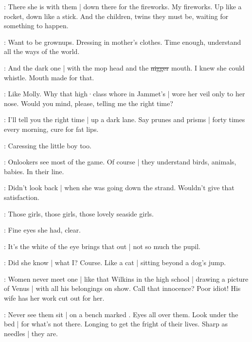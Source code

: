 \BloomCurrent:
There she is with them |
down there for the fireworks.
My fireworks.
Up like a rocket,
down like a stick.
And the children,
twins they must be,
waiting for something to happen.

\BloomAbstract:
Want to be grownups.
Dressing in mother's clothes.
Time enough,
understand all the ways of the world.

\BloomCurrent:
And the dark one |
with the mop head
and the \sout{nigger} mouth.
I knew she could whistle.
Mouth made for that.

\BloomHist:
Like Molly.
Why that high·class whore in Jammet's |
wore her veil
only to her nose.%
Would you mind,
please,
telling me the right time?

\BloomAbstract:
I'll tell you the right time |
up a dark lane.
Say prunes and prisms |
forty times every morning,
cure for fat lips.

\BloomCurrent:
Caressing the little boy too.

\BloomAbstract:
Onlookers see most of the game.
Of course |
they understand birds,
animals,
babies.
In their line.

\BloomCurrent:
Didn't look back |
when she was going down the strand.
Wouldn't give that satisfaction.

\BloomHist:
Those girls,
those girls,
those lovely seaside girls.

\BloomCurrent:
Fine eyes she had,
clear.

\BloomAbstract:
It's the white of the eye brings that out |
not so much the pupil.

\BloomCurrent:
Did she know |
what I?
Course.
Like a cat |
sitting beyond a dog's jump.

\BloomHist:
Women never meet one |
like that Wilkins in the high school |
drawing a picture of Venus |
with all his belongings on show.%
Call that innocence?
Poor idiot!
His wife has her work cut out for her.

\BloomAbstract:
Never see them sit |
on a bench marked .
Eyes all over them.
Look under the bed |
for what's not there.
Longing to get the fright of their lives.
Sharp as needles |
they are.

